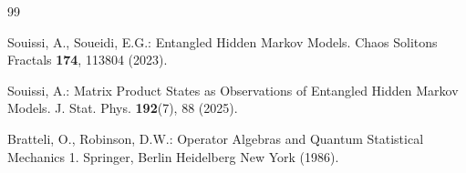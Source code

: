 \documentclass[11pt,a4paper]{article}
\begin{document}
\begin{thebibliography}{99}




Souissi, A., Soueidi, E.G.:
Entangled Hidden Markov Models.
Chaos Solitons Fractals \textbf{174}, 113804 (2023).


Souissi, A.:
Matrix Product States as Observations of Entangled Hidden Markov Models.
J. Stat. Phys. \textbf{192}(7), 88 (2025).

Bratteli, O., Robinson, D.W.:
Operator Algebras and Quantum Statistical Mechanics 1.
Springer, Berlin Heidelberg New York (1986).




\end{thebibliography}
\end{document}
